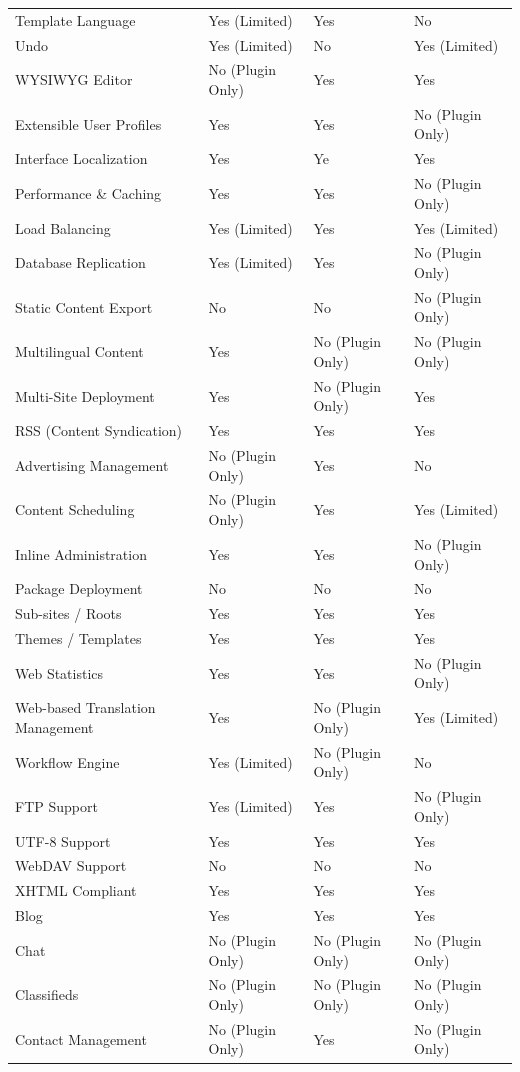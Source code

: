\documentclass[12pt]{report}
\begin{document}
\begin{longtable}[H]{|| p{.3\linewidth} | p{.19\linewidth} | p{.19\linewidth} | p{.19\linewidth} ||}
Template Language & Yes (Limited) & Yes & No \\
Undo & Yes (Limited) & No & Yes (Limited) \\
WYSIWYG Editor & No (Plugin Only) & Yes & Yes \\
Extensible User Profiles & Yes & Yes & No (Plugin Only) \\
Interface Localization & Yes & Ye & Yes \\
Performance \& Caching & Yes & Yes & No (Plugin Only) \\
Load Balancing & Yes (Limited) & Yes & Yes (Limited) \\
Database Replication & Yes (Limited) & Yes & No (Plugin Only) \\
Static Content Export & No & No & No (Plugin Only) \\
Multilingual Content & Yes & No (Plugin Only) & No (Plugin Only) \\
Multi-Site Deployment & Yes & No (Plugin Only) & Yes \\
RSS (Content Syndication) & Yes & Yes & Yes \\
Advertising Management & No (Plugin Only) & Yes & No \\
Content Scheduling & No (Plugin Only) & Yes & Yes (Limited) \\
Inline Administration & Yes & Yes & No (Plugin Only) \\
Package Deployment & No & No & No \\
Sub-sites / Roots & Yes & Yes & Yes \\
Themes / Templates & Yes & Yes & Yes \\
Web Statistics & Yes & Yes & No (Plugin Only) \\
Web-based Translation Management & Yes & No (Plugin Only) & Yes (Limited) \\
Workflow Engine & Yes (Limited) & No (Plugin Only) & No \\
FTP Support & Yes (Limited) & Yes & No (Plugin Only) \\
UTF-8 Support & Yes & Yes & Yes \\
WebDAV Support & No & No & No \\
XHTML Compliant & Yes & Yes & Yes \\
Blog & Yes & Yes & Yes \\
Chat & No (Plugin Only) & No (Plugin Only) & No (Plugin Only) \\
Classifieds & No (Plugin Only) & No (Plugin Only) & No (Plugin Only) \\
Contact Management & No (Plugin Only) & Yes & No (Plugin Only) \\

\end{longtable}
\end{document}
